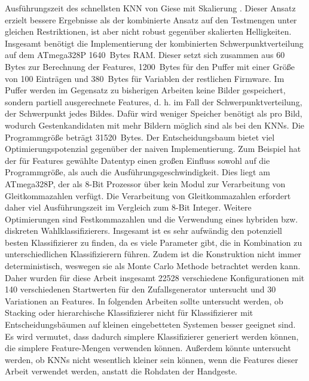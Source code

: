 Ausführungszeit des schnellsten KNN von Giese mit Skalierung \cite{gieseThesis}. Dieser Ansatz erzielt bessere Ergebnisse als der kombinierte Ansatz auf den Testmengen unter gleichen Restriktionen,
ist aber nicht robust gegenüber skalierten Helligkeiten.
\newline
\newline
Insgesamt benötigt die Implementierung der kombinierten Schwerpunktverteilung auf dem ATmega328P 1640~Bytes RAM. Dieser setzt sich zusammen aus 60 Bytes zur Berechnung der Features, 1200~Bytes
für den Puffer mit einer Größe von 100 Einträgen und 380~Bytes für Variablen der restlichen Firmware. Im Puffer werden im Gegensatz zu bisherigen Arbeiten keine Bilder gespeichert, sondern partiell
ausgerechnete Features, d. h. im Fall der Schwerpunktverteilung, der Schwerpunkt jedes Bildes. Dafür wird weniger Speicher benötigt als pro Bild, wodurch Gestenkandidaten mit mehr Bildern möglich sind
als bei den KNNs. Die Programmgröße beträgt 31520~Bytes.
\newline
\newline
Der Entscheidungsbaum bietet viel Optimierungspotenzial gegenüber der naiven Implementierung. Zum Beispiel hat der für Features gewählte Datentyp einen großen Einfluss sowohl auf die Programmgröße, als
auch die Ausführungsgeschwindigkeit. Dies liegt am ATmega328P, der als 8-Bit Prozessor über kein Modul zur Verarbeitung von Gleitkommazahlen verfügt.
Die Verarbeitung von Gleitkommazahlen erfordert daher viel Ausführungszeit im Vergleich zum 8-Bit Integer. Weitere Optimierungen sind Festkommazahlen und die Verwendung eines hybriden bzw.
diskreten Wahlklassifizierers.
\newline
\newline
Insgesamt ist es sehr aufwändig den potenziell besten Klassifizierer zu finden, da es viele Parameter gibt, die in Kombination zu unterschiedlichen Klassifizierern führen. Zudem ist die
Konstruktion nicht immer deterministisch, weswegen sie als Monte Carlo Methode betrachtet werden kann. Daher wurden für diese Arbeit insgesamt 22528 verschiedene Konfigurationen mit 140 verschiedenen
Startwerten für den Zufallsgenerator untersucht und 30 Variationen an Features.
\newline
\newline
In folgenden Arbeiten sollte untersucht werden, ob Stacking oder hierarchische Klassifizierer nicht für Klassifizierer mit Entscheidungsbäumen auf kleinen eingebetteten Systemen besser geeignet sind.
Es wird vermutet, dass dadurch simplere Klassifizierer generiert werden können, die simplere Feature-Mengen verwenden können. Außerdem könnte untersucht werden, ob KNNs nicht wesentlich kleiner sein
können, wenn die Features dieser Arbeit verwendet werden, anstatt die Rohdaten der Handgeste.